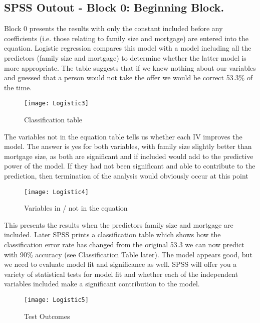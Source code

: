 \documentclass[a4paper,12pt]{article}
\begin{document}
\subsection{SPSS Outout  - Block 0: Beginning Block.}
Block 0 presents the results with only the constant included
before any coefficients (i.e. those relating to family size and mortgage) are entered into
the equation. Logistic regression compares this model with a model including all the
predictors (family size and mortgage) to determine whether the latter model is more
appropriate. The table suggests that if we knew nothing about our variables and guessed
that a person would not take the offer we would be correct 53.3\% of the time.
\begin{figure}[h!]
\begin{center}
  \texttt{[image: Logistic3]}\\
  \caption{Classification table}
\end{center}
\end{figure}
The variables not in the equation table tells us whether each IV improves the model. The answer is yes for both variables, with family size slightly better than mortgage size, as both are significant and if included would add to the predictive power of the model. If they had not been significant and able to contribute to the prediction,
then termination of the analysis would obviously occur at this point

\begin{figure}
\begin{center}
  \texttt{[image: Logistic4]}\\
  \caption{Variables in / not in the equation}
\end{center}
\end{figure}
This presents the results when the predictors family size and
mortgage are included. Later SPSS prints a classification table which shows how the
classification error rate has changed from the original 53.3%
we can now predict with 90\% accuracy (see Classification Table later). The
model appears good, but we need to evaluate model fit and significance as well. SPSS will
offer you a variety of statistical tests for model fit and whether each of the independent
variables included make a significant contribution to the model.
\begin{figure}
\begin{center}
  \texttt{[image: Logistic5]}\\
  \caption{Test Outcomes}
\end{center}
\end{figure}
\end{document}
